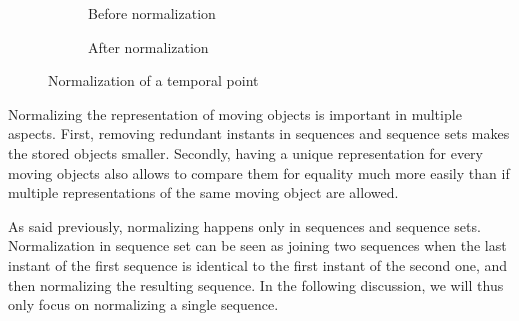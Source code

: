 \begin{figure}[h!]
\centering
\vspace{.5 cm}
\begin{subfigure}[b]{0.475\textwidth}
    \centering
    \caption{Before normalization}
\end{subfigure}
\hfill
\begin{subfigure}[b]{0.475\textwidth}
    \centering
    \caption{After normalization}
\end{subfigure}
\caption{Normalization of a temporal point}
\label{fig:tgeopointseq_normalization}
\end{figure}

Normalizing the representation of moving objects is important in multiple aspects. First, removing redundant instants in sequences and sequence sets makes the stored objects smaller. Secondly, having a unique representation for every moving objects also allows to compare them for equality much more easily than if multiple representations of the same moving object are allowed.

As said previously, normalizing happens only in sequences and sequence sets. Normalization in sequence set can be seen as joining two sequences when the last instant of the first sequence is identical to the first instant of the second one, and then normalizing the resulting sequence. In the following discussion, we will thus only focus on normalizing a single sequence.

